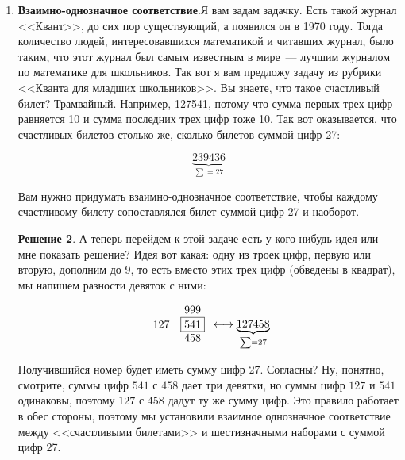 \documentclass[russian]{lecture-notes}
\theoremstyle{definition}
\newtheorem*{solution}{Решение}
\begin{document}
\begin{enumerate}
\begin{solution}
		\end{solution}
	
		Следующая задача связана с самым главным, наверное, приемом в комбинаторике~--- это взаимно-однозначное соответствие.
		
		
		\item \textbf{Взаимно-однозначное соответствие}.Я вам задам задачку. Есть такой журнал <<Квант>>, до сих пор существующий, а появился он в 1970 году. Тогда количество людей, интересовавшихся математикой и читавших журнал, было таким, что этот журнал был самым известным в мире~--- лучшим журналом по математике для школьников. Так вот я вам предложу задачу из рубрики <<Кванта для младших школьников>>. Вы знаете, что такое счастливый билет? Трамвайный. Например, 127541, потому что сумма первых трех цифр равняется 10 и сумма последних трех цифр тоже 10. Так вот оказывается, что счастливых билетов столько же, сколько билетов суммой цифр 27:
		
		\[
			\underbrace{239436}_{\sum = 27}
		\]
		
		
		\begin{problem}
			Вам нужно придумать взаимно-однозначное соответствие, чтобы каждому счастливому билету сопоставлялся билет суммой цифр 27 и наоборот.
		\end{problem}
		
		\begin{solution}
			А теперь перейдем к этой задаче есть у кого-нибудь идея или мне показать решение? Идея вот какая: одну из троек цифр, первую или вторую, дополним до 9, то есть вместо этих трех цифр (обведены в квадрат), мы напишем разности девяток с ними:
			
			\[
				\begin{array}{cc}
				& 999 \\
				127 & \fbox{541} \\
				& 458
				\end{array} \longleftrightarrow \underbrace{127458}_{\sum = 27}
			\]
			
			Получившийся номер будет иметь сумму цифр 27. Согласны? Ну, понятно, смотрите, суммы цифр $541$ с $458$ дает три девятки, но суммы цифр $127$ и $541$ одинаковы, поэтому $127$ с $458$ дадут ту же сумму цифр. Это правило работает в обес стороны, поэтому мы установили взаимное однозначное соответствие между <<счастливыми билетами>> и шестизначными наборами с суммой цифр 27.
		\end{solution}
		

\end{enumerate}
\end{document}
